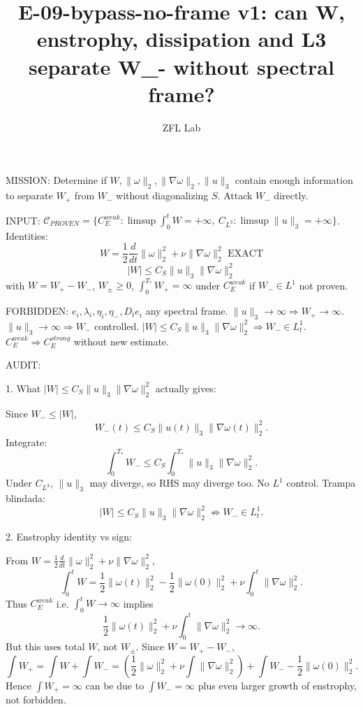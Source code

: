 \documentclass[11pt]{article}
\title{E-09-bypass-no-frame v1: can W, enstrophy, dissipation and L3 separate W\_- without spectral frame?}
\author{ZFL Lab}
\begin{document}
\maketitle

MISSION: Determine if $W,\|\omega\|_2,\|\nabla\omega\|_2,\|u\|_3$ contain enough information to separate $W_+$ from $W_-$ without diagonalizing $S$. Attack $W_-$ directly.

INPUT: $\mathcal{C}_{PROVEN}=\{C_E^{weak}: \limsup\int_0^t W=+\infty,\ C_{L^3}: \limsup\|u\|_3=+\infty\}$. Identities:
\begin{equation*}
\boxed{W=\frac12\frac{d}{dt}\|\omega\|_2^2+\nu\|\nabla\omega\|_2^2\text{ EXACT}}
\end{equation*}
\begin{equation*}
\boxed{|W|\le C_S\|u\|_3\|\nabla\omega\|_2^2}
\end{equation*}
with $W=W_+-W_-$, $W_\pm\ge0$, $\int_0^{T_*}W_+=\infty$ under $C_E^{weak}$ if $W_-\in L^1$ not proven.

FORBIDDEN:
$e_i,\lambda_i,\eta_i,\eta_-,D_t e_i$ any spectral frame.
$\|u\|_3\to\infty\Rightarrow W_+\to\infty$.
$\|u\|_3\to\infty\Rightarrow W_-$ controlled.
$|W|\le C_S\|u\|_3\|\nabla\omega\|_2^2\Rightarrow W_-\in L^1_t$.
$C_E^{weak}\Rightarrow C_E^{strong}$ without new estimate.

AUDIT:

1. What $|W|\le C_S\|u\|_3\|\nabla\omega\|_2^2$ actually gives:

Since $W_-\le|W|$,
\begin{equation*}
W_-(t)\le C_S\|u(t)\|_3\|\nabla\omega(t)\|_2^2.
\end{equation*}
Integrate:
\begin{equation*}
\int_0^{T_*}W_-\le C_S\int_0^{T_*}\|u\|_3\|\nabla\omega\|_2^2.
\end{equation*}
Under $C_{L^3}$, $\|u\|_3$ may diverge, so RHS may diverge too. No $L^1$ control. Trampa blindada:
\begin{equation*}
\boxed{|W|\le C_S\|u\|_3\|\nabla\omega\|_2^2\not\Rightarrow W_-\in L^1_t}.
\end{equation*}

2. Enstrophy identity vs sign:

From $W=\frac12\frac{d}{dt}\|\omega\|_2^2+\nu\|\nabla\omega\|_2^2$,
\begin{equation*}
\int_0^t W = \frac12\|\omega(t)\|_2^2-\frac12\|\omega(0)\|_2^2+\nu\int_0^t\|\nabla\omega\|_2^2.
\end{equation*}
Thus $C_E^{weak}$ i.e. $\int_0^t W\to\infty$ implies
\begin{equation*}
\boxed{\frac12\|\omega(t)\|_2^2+\nu\int_0^t\|\nabla\omega\|_2^2\to\infty}.
\end{equation*}
But this uses total $W$, not $W_\pm$. Since $W=W_+-W_-$,
\begin{equation*}
\int W_+ = \int W + \int W_- = \left(\frac12\|\omega\|_2^2+\nu\int\|\nabla\omega\|_2^2\right)+\int W_- -\frac12\|\omega(0)\|_2^2.
\end{equation*}
Hence $\int W_+=\infty$ can be due to $\int W_-=\infty$ plus even larger growth of enstrophy, not forbidden.
\end{document}
